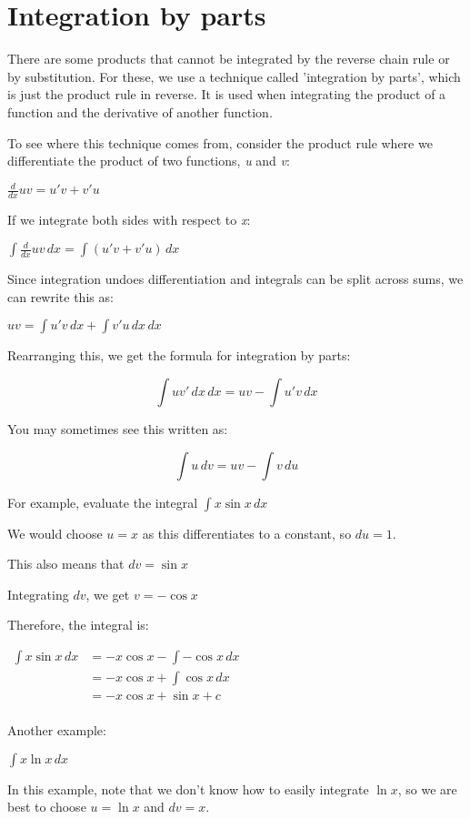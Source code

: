 \documentclass[../main.tex]{subfiles}
\begin{document}
\section{Integration by parts}
There are some products that cannot be integrated by the reverse chain rule or by substitution. For these, we use a technique called 'integration by parts', which is just the product rule in reverse. It is used when integrating the product of a function and the derivative of another function.

To see where this technique comes from, consider the product rule where we differentiate the product of two functions, \textit{u} and \textit{v}:

\(\frac{d}{dx}uv=u'v + v'u\)

If we integrate both sides with respect to \textit{x}:

\(\int \frac{d}{dx}uv\,dx=\int (u'v + v'u)\,dx\)

Since integration undoes differentiation and integrals can be split across sums, we can rewrite this as:

\(uv=\int u'v\,dx + \int v'u\,dx\,dx\)

Rearranging this, we get the formula for integration by parts:

\[\int uv'\,dx\,dx = uv - \int u'v\,dx\]

You may sometimes see this written as:

\[\int u \,dv=uv-\int v \, du\]

For example, evaluate the integral \(\int x \sin{x} \, dx\)

We would choose \(u=x\) as this differentiates to a constant, so \(du = 1\).

This also means that \(dv=\sin{x}\)

Integrating \(dv\), we get \(v=-\cos{x}\)

Therefore, the integral is:

$
\!
\begin{aligned}
    \int x \sin{x} \, dx
    &=-x\cos{x}- \int -\cos{x} \, dx\\
    &=-x\cos{x} + \int \cos{x} \, dx\\
    &=-x\cos{x}+\sin{x}+c\\
\end{aligned}
$

Another example:

\(\int x \ln{x} \,dx\)

In this example, note that we don't know how to easily integrate \(\ln{x}\), so we are best to choose \(u=\ln{x}\) and \(dv=x\).
\end{document}
